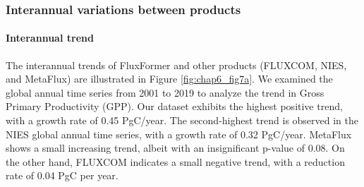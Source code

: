 \subsubsection*{Interannual variations between products}
\paragraph*{Interannual trend}

The interannual trends of FluxFormer and other products (FLUXCOM, NIES, and MetaFlux) are illustrated in Figure \ref{fig:chap6_fig7a}. We examined the global annual time series from 2001 to 2019 to analyze the trend in Gross Primary Productivity (GPP). Our dataset exhibits the highest positive trend, with a growth rate of 0.45 PgC/year. The second-highest trend is observed in the NIES global annual time series, with a growth rate of 0.32 PgC/year. MetaFlux shows a small increasing trend, albeit with an insignificant p-value of 0.08. On the other hand, FLUXCOM indicates a small negative trend, with a reduction rate of 0.04 PgC per year.\par

